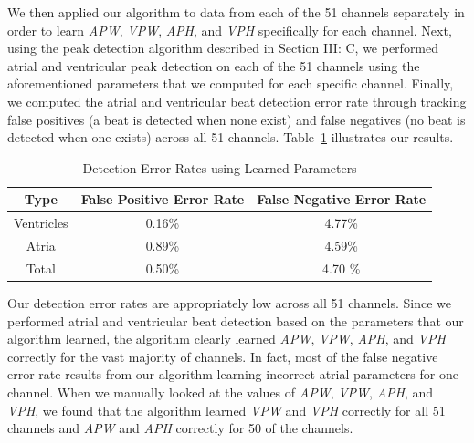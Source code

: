 \documentclass[conference]{IEEEtran}
\newcommand{\APW}{\textit{APW}}
\newcommand{\VPW}{\textit{VPW}}
\newcommand{\APH}{\textit{APH}}
\newcommand{\VPH}{\textit{VPH}}
\begin{document}
We then applied our algorithm to data
from each of the 51 channels separately in order to learn
\APW{}, \VPW{}, \APH{}, and \VPH{} specifically for each
channel. Next, using the peak detection algorithm
described in Section III: C, we performed atrial and
ventricular peak detection on each of the 51 channels
using the aforementioned parameters that we computed
for each specific channel. Finally, we computed the
atrial and ventricular beat detection error rate through
tracking false positives (a beat is detected when none
exist) and false negatives (no beat is detected when one
exists) across all 51 channels.
Table~\ref{tab:errors} illustrates our results.
\begin{table}[h]
	\caption{Detection Error Rates using Learned Parameters}
	\label{tab:errors}
	\centering
	\begin{tabular}{|c|c|c|}
		\hline
		Type & False Positive Error Rate & False Negative Error Rate \\
		\hline 
		Ventricles & 0.16\% &4.77\% \\
		\hline
		Atria & 0.89\% & 4.59\% \\
		\hline
		Total & 0.50\% & 4.70 \% \\
		\hline
	\end{tabular}
\end{table}

Our detection error rates are appropriately low across
all 51 channels. Since we performed atrial and
ventricular beat detection based on the parameters that
our algorithm learned, the algorithm clearly learned
\APW{}, \VPW{}, \APH{}, and \VPH{} correctly for the vast
majority of channels. In fact, most of the false negative
error rate results from our algorithm learning incorrect
atrial parameters for one channel. When we manually
looked at the values of \APW{}, \VPW{}, \APH{}, and \VPH{}, we
found that the algorithm learned \VPW{} and \VPH{} correctly
for all 51 channels and \APW{} and \APH{} correctly for 50 of
the channels.
\end{document}
